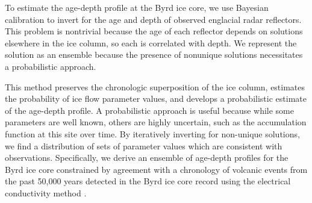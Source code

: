 


To estimate the age-depth profile at the Byrd ice core, we use Bayesian calibration to invert for the age and depth of observed englacial radar reflectors. This problem is nontrivial because the age of each reflector depends on solutions elsewhere in the ice column, so each is correlated with depth. We represent the solution as an ensemble because the presence of nonunique solutions necessitates a probabilistic approach.

This method preserves the chronologic superposition of the ice column, estimates the probability of ice flow parameter values, and develops a probabilistic estimate of the age-depth profile. A probabilistic approach is useful because while some parameters are well known, others are highly uncertain, such as the accumulation function at this site over time. By iteratively inverting for non-unique solutions, we find a distribution of sets of parameter values which are consistent with observations. Specifically, we derive an ensemble of age-depth profiles for the Byrd ice core constrained by agreement with a chronology of volcanic events from the past 50,000 years detected in the Byrd ice core record using the electrical conductivity method \citep{hammer1997}. 



